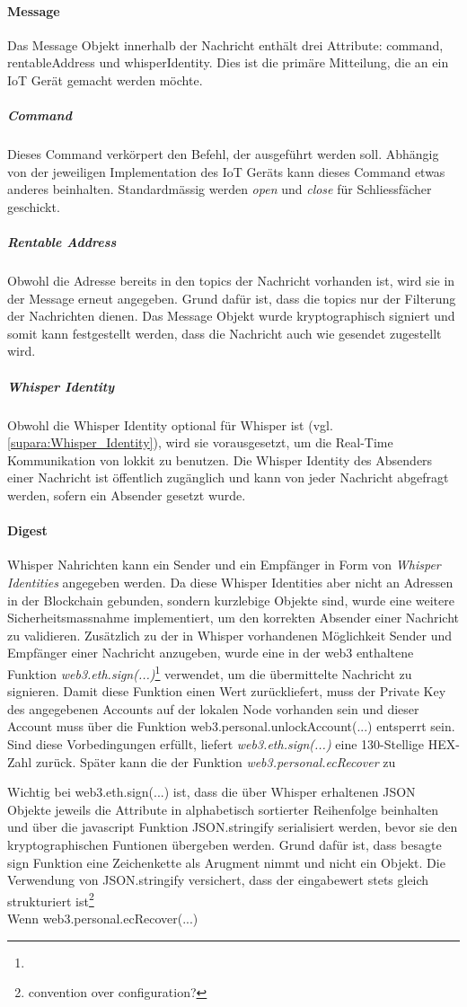 \paragraph{Message}
Das Message Objekt innerhalb der Nachricht enthält drei Attribute: command, rentableAddress und whisperIdentity. Dies ist die primäre Mitteilung, die an ein IoT Gerät gemacht werden möchte.
\subparagraph{Command}
Dieses Command verkörpert den Befehl, der ausgeführt werden soll. Abhängig von der jeweiligen Implementation des IoT Geräts kann dieses Command etwas anderes beinhalten. Standardmässig werden \emph{open} und \emph{close} für Schliessfächer geschickt.
\subparagraph{Rentable Address}
Obwohl die Adresse bereits in den topics der Nachricht vorhanden ist, wird sie in der Message erneut angegeben. Grund dafür ist, dass die topics nur der Filterung der Nachrichten dienen. Das Message Objekt wurde kryptographisch signiert und somit kann festgestellt werden, dass die Nachricht auch wie gesendet zugestellt wird.
\subparagraph{Whisper Identity}
Obwohl die Whisper Identity optional für Whisper ist (vgl. \ref{supara:Whisper_Identity}), wird sie vorausgesetzt, um die Real-Time Kommunikation von lokkit zu benutzen. Die Whisper Identity des Absenders einer Nachricht ist öffentlich zugänglich und kann von jeder Nachricht abgefragt werden, sofern ein Absender gesetzt wurde.

\paragraph{Digest}
Whisper Nahrichten kann ein Sender und ein Empfänger in Form von \emph{Whisper Identities} angegeben werden. Da diese Whisper Identities aber nicht an Adressen in der Blockchain gebunden, sondern kurzlebige Objekte sind, wurde eine weitere Sicherheitsmassnahme implementiert, um den korrekten Absender einer Nachricht zu validieren.
Zusätzlich zu der in Whisper vorhandenen Möglichkeit Sender und Empfänger einer Nachricht anzugeben, wurde eine in der web3 enthaltene Funktion \emph{web3.eth.sign(...)}\footnote{} verwendet, um die übermittelte Nachricht zu signieren. Damit diese Funktion einen Wert zurückliefert, muss der Private Key des angegebenen Accounts auf der lokalen Node vorhanden sein und dieser Account muss über die Funktion web3.personal.unlockAccount(...) entsperrt sein. Sind diese Vorbedingungen erfüllt, liefert \emph{web3.eth.sign(...)} eine 130-Stellige HEX-Zahl zurück. Später kann die  der Funktion \emph{web3.personal.ecRecover} zu

Wichtig bei web3.eth.sign(...) ist, dass die über Whisper erhaltenen JSON Objekte jeweils die Attribute in alphabetisch sortierter Reihenfolge beinhalten und über die javascript Funktion JSON.stringify serialisiert werden, bevor sie den kryptographischen Funtionen übergeben werden. Grund dafür ist, dass besagte sign Funktion eine Zeichenkette als Arugment nimmt und nicht ein Objekt. Die Verwendung von JSON.stringify versichert, dass der eingabewert stets gleich strukturiert ist\footnote{convention over configuration?}
\\Wenn web3.personal.ecRecover(...)

